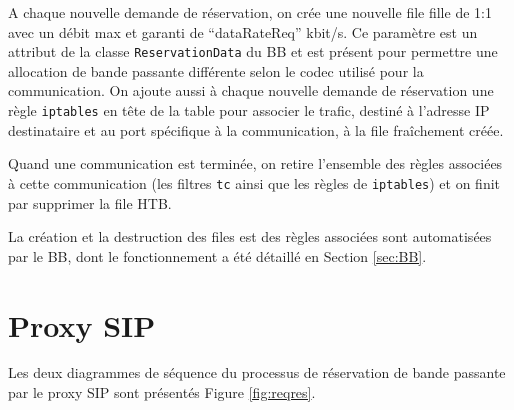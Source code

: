 \documentclass[a4paper,11pt]{article}
\let\Oldsection\section
\renewcommand{\section}{\FloatBarrier\Oldsection}
\begin{document}
A chaque nouvelle demande de réservation, on crée une nouvelle file fille de 1:1 avec un débit max et garanti de “dataRateReq” kbit/s. Ce paramètre est un attribut de la classe \texttt{ReservationData} du BB et est présent pour permettre une allocation de bande passante différente selon le codec utilisé pour la communication. On ajoute aussi à chaque nouvelle demande de réservation une règle \texttt{iptables} en tête de la table pour associer le trafic, destiné à l’adresse IP destinataire et au port spécifique à la communication, à la file fraîchement créée. 

Quand une communication est terminée, on retire l’ensemble des règles associées à cette communication (les filtres \texttt{tc} ainsi que les règles de \texttt{iptables}) et on finit par supprimer la file HTB.

La création et la destruction des files est des règles associées sont automatisées par le BB, dont le fonctionnement a été détaillé en Section \ref{sec:BB}.

\section{Proxy SIP}

Les deux diagrammes de séquence du processus de réservation de bande passante par le proxy SIP sont présentés Figure \ref{fig:reqres}.
\end{document}
